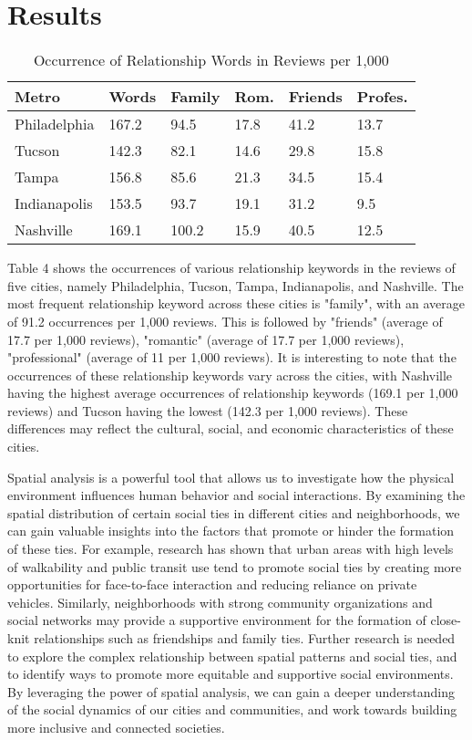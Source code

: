 \section{Results}

\begin{table}[htbp]
  \renewcommand{\arraystretch}{1.2}
  \caption{Occurrence of Relationship Words in Reviews per 1,000}
  \label{table:poi_stats}
  \centering
  \begin{tabular}{|p{1.3cm}|p{1cm}|p{1cm}|p{1cm}|p{1cm}|p{1cm}|}
    \hline
    \textbf{Metro} & \textbf{Words} & \textbf{Family} & \textbf{Rom.} & \textbf{Friends} & \textbf{Profes.} \\
    \hline
    Philadelphia & 167.2 & 94.5 & 17.8 & 41.2 & 13.7 \\
    \hline
    Tucson & 142.3 & 82.1 & 14.6 & 29.8 & 15.8 \\
    \hline
    Tampa & 156.8 & 85.6 & 21.3 & 34.5 & 15.4  \\
    \hline
    Indianapolis & 153.5 & 93.7 & 19.1 & 31.2 & 9.5 \\
    \hline
    Nashville & 169.1 & 100.2 & 15.9 & 40.5 & 12.5 \\
    \hline
  \end{tabular}
\end{table}

Table 4 shows the occurrences of various relationship keywords in the reviews of five cities, namely Philadelphia, Tucson, Tampa, Indianapolis, and Nashville. The most frequent relationship keyword across these cities is "family", with an average of 91.2 occurrences per 1,000 reviews. This is followed by "friends" (average of 17.7 per 1,000 reviews), "romantic" (average of 17.7 per 1,000 reviews), "professional" (average of 11 per 1,000 reviews). It is interesting to note that the occurrences of these relationship keywords vary across the cities, with Nashville having the highest average occurrences of relationship keywords (169.1 per 1,000 reviews) and Tucson having the lowest (142.3 per 1,000 reviews). These differences may reflect the cultural, social, and economic characteristics of these cities.

Spatial analysis is a powerful tool that allows us to investigate how the physical environment influences human behavior and social interactions. By examining the spatial distribution of certain social ties in different cities and neighborhoods, we can gain valuable insights into the factors that promote or hinder the formation of these ties. For example, research has shown that urban areas with high levels of walkability and public transit use tend to promote social ties by creating more opportunities for face-to-face interaction\cite{b8} and reducing reliance on private vehicles. Similarly, neighborhoods with strong community organizations and social networks may provide a supportive environment for the formation of close-knit relationships such as friendships and family ties. Further research is needed to explore the complex relationship between spatial patterns and social ties, and to identify ways to promote more equitable and supportive social environments. By leveraging the power of spatial analysis, we can gain a deeper understanding of the social dynamics of our cities and communities, and work towards building more inclusive and connected societies.